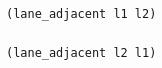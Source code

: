 \documentclass[border=8pt,12pt]{standalone}
\begin{document}
\begin{lstlisting}
(lane_adjacent l1 l2)

(lane_adjacent l2 l1)
\end{lstlisting}
\end{document}
